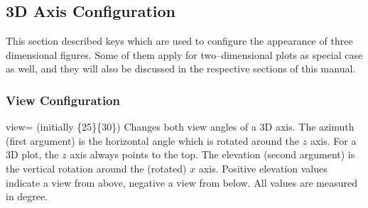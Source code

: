 

\subsection{3D Axis Configuration}
This section described keys which are used to configure the appearance of three dimensional figures. Some of them apply for two--dimensional plots as special case as well, and they will also be discussed in the respective sections of this manual.

\subsubsection{View Configuration}
\begin{pgfplotskey}{view= (initially \{25\}\{30\})}
	Changes both view angles of a 3D axis. The azimuth (first argument) is the horizontal angle which is rotated around the $z$ axis. For a 3D plot, the $z$ axis always points to the top. The elevation (second argument) is the vertical rotation around the (rotated) $x$ axis. Positive elevation values indicate a view from above, negative a view from below. All values are measured in degree.

\pgfplotsexpensiveexample
\begin{codeexample}[]
\end{codeexample}

\pgfplotsexpensiveexample
\begin{codeexample}[]
\end{codeexample}

\pgfplotsexpensiveexample
\begin{codeexample}[]
\end{codeexample}


\end{pgfplotskey}
